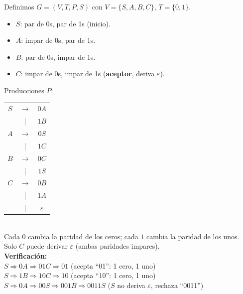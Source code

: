 \documentclass[12pt]{article}
\begin{document}
\begin{enumerate}
{            Definimos $G = (V, T, P, S)$ con $V = \{ S, A, B, C \}$, $T = \{ 0, 1 \}$.
            \vspace{-0.2cm}
            \begin{itemize}
                \item $S$: par de 0s, par de 1s (inicio).
                \item $A$: impar de 0s, par de 1s.
                \item $B$: par de 0s, impar de 1s.
                \item $C$: impar de 0s, impar de 1s (\textbf{aceptor}, deriva $\varepsilon$).
            \end{itemize}
            Producciones $P$: \\
            \begin{tabular}{ccc}
                $S$ & $\rightarrow$ & $0A$ \\
                & | & $1B$ \\
                $A$ & $\rightarrow$ & $0S$ \\
                & | & $1C$ \\
                $B$ & $\rightarrow$ & $0C$ \\
                & | & $1S$ \\
                $C$ & $\rightarrow$ & $0B$ \\
                & | & $1A$ \\
                & | & $\varepsilon$ \\
            \end{tabular} \\

            Cada $0$ cambia la paridad de los ceros; cada $1$ cambia la paridad de los unos. \\
            Solo $C$ puede derivar $\varepsilon$ (ambas paridades impares). \\

            \textbf{Verificación:} \\
            $S \Rightarrow 0A \Rightarrow 01C \Rightarrow 01$ \quad (acepta ``01'': 1 cero, 1 uno) \\
            $S \Rightarrow 1B \Rightarrow 10C \Rightarrow 10$ \quad (acepta ``10'': 1 cero, 1 uno) \\
            $S \Rightarrow 0A \Rightarrow 00S \Rightarrow 001B \Rightarrow 0011S$ \quad ($S$ no deriva $\varepsilon$, rechaza ``0011'')
        }


\end{enumerate}
\end{document}
